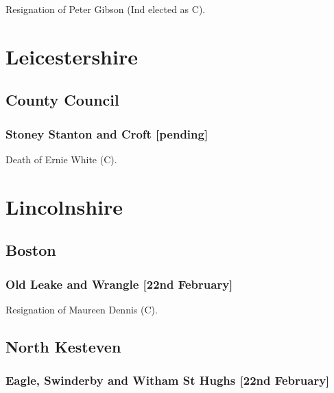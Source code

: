 \documentclass[a4paper,openany]{book}
\begin{document}
\begin{resultsiii}
Resignation of Peter Gibson (Ind elected as C).

\section{Leicestershire}

\subsection*{County Council}

\subsubsection*{Stoney Stanton and Croft \hspace*{\fill}\nolinebreak[1]%
\enspace\hspace*{\fill}
[pending]}


Death of Ernie White (C).

\section{Lincolnshire}

\subsection*{Boston}

\subsubsection*{Old Leake and Wrangle \hspace*{\fill}\nolinebreak[1]%
\enspace\hspace*{\fill}
[22nd February]}


Resignation of Maureen Dennis (C).

\subsection*{North Kesteven}

\subsubsection*{Eagle, Swinderby and Witham St Hughs \hspace*{\fill}\nolinebreak[1]%
\enspace\hspace*{\fill}
[22nd February]}


\end{resultsiii}
\end{document}
